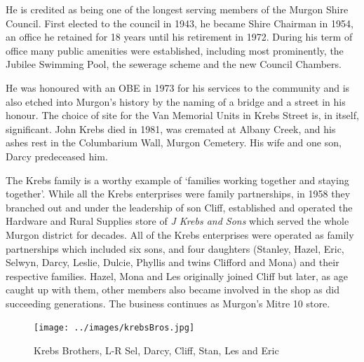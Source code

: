 He is credited as being one of the longest serving members of the Murgon Shire Council. First elected to the council in 1943, he became Shire Chairman in 1954, an office he retained for 18 years until his retirement in 1972. During his term of office many public amenities were established, including most prominently, the Jubilee Swimming Pool, the sewerage scheme and the new Council Chambers.



He was honoured with an OBE in 1973 for his services to the community and is also etched into Murgon's history by the naming of a bridge and a street in his honour. The choice of site for the Van Memorial Units in Krebs Street is, in itself, significant. John Krebs died in 1981, was cremated at Albany Creek, and his ashes rest in the Columbarium Wall, Murgon Cemetery. His wife and one son, Darcy predeceased him.



The Krebs family is a worthy example of `families working together and staying together'. While all the Krebs enterprises were family partnerships, in 1958 they branched out and under the leadership of son Cliff, established and operated the Hardware and Rural Supplies store of \emph{J Krebs and Sons} which served the whole Murgon district for decades. All of the Krebs enterprises were operated as family partnerships which included six sons, and four daughters (Stanley, Hazel, Eric, Selwyn, Darcy, Leslie, Dulcie, Phyllis and twins Clifford and Mona) and their respective families. Hazel, Mona and Les originally joined Cliff but later, as age caught up with them, other members also became involved in the shop as did succeeding generations. The business continues as Murgon's Mitre 10 store.









\begin{figure}
\begin{center}
\texttt{[image: ../images/krebsBros.jpg]}
\caption{Krebs Brothers, L-R Sel, Darcy, Cliff, Stan, Les and Eric}
\end{center}
\end{figure}





